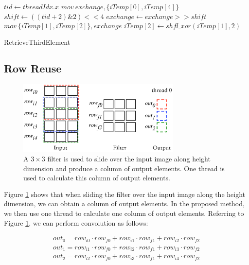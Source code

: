 \begin{algorithm}[t!]
	$tid \gets threadIdx.x$\;
	$mov\ exchange, \{iTemp[0], iTemp[4]\}$\;
	$shift \gets ((tid+2)\&2)<<4$\;
	$exchange \gets exchange >> shift$\;
	$mov\ \{iTemp[1],iTemp[2]\}, exchange$\;
	$iTemp[2] \gets shfl\_xor(iTemp[1],2)$\;	
	
	\caption{RetrieveThirdElement}
	\label{algo:basic}
\end{algorithm}


\subsection{Row Reuse}
\label{sec:rowreuse}
\begin{figure}
	\centering
	\includegraphics[width=0.9\columnwidth,height=3.7cm]{./figure/rowreuse.eps}
\caption{A $3 \times 3$ filter is used to slide over the input image along height dimension and produce a column of output elements. One
thread is used to calculate this column of output elements.}
\label{fig:rowreuse}
\end{figure}

Figure \ref{fig:rowreuse} shows that when sliding the filter over the input image along the height dimension, we can obtain a column of output elements. In the proposed method, we then use one thread to calculate one column of output elements. Referring to Figure \ref{fig:rowreuse},
we can perform convolution as follows:

\begin{gather*}
  out_0=row_{i0} \cdot row_{f0} + row_{i1} \cdot row_{f1} + row_{i2} \cdot row_{f2} \\
out_{1}=row_{i1} \cdot row_{f0} + row_{i2} \cdot row_{f1} + row_{i3} \cdot row_{f2} \\
out_{2}=row_{i2} \cdot row_{f0} + row_{i3} \cdot row_{f1} + row_{i4} \cdot row_{f2}
\end{gather*}

